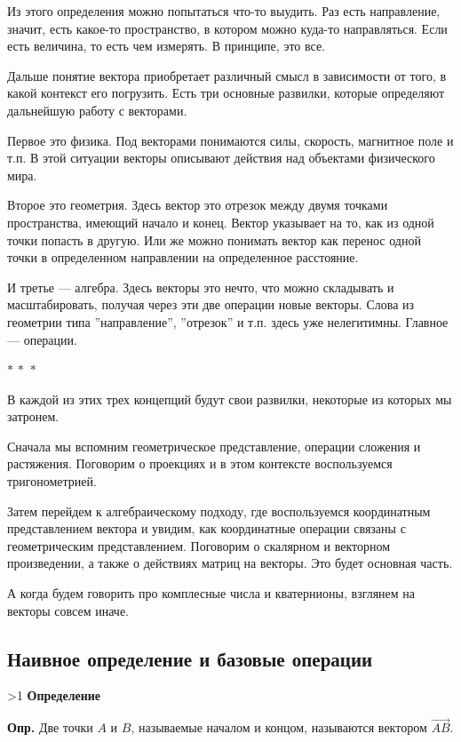 \documentclass[a4paper,12pt]{article}
\newcommand{\threestars}{\begin{center}$ {\ast}\,{\ast}\,{\ast} $\end{center}}
\newcounter{th-counter}
\newcounter{df-counter}
\newcounter{col-counter}
\newcommand{\df}{\par\noindent\textbf{Опр.} }
\newcounter{subpoint}[subsection]
\renewcommand{\thesubpoint}{\arabic{subpoint}}
\newcommand{\subpoint}[1]{%
  \refstepcounter{subpoint}%
  \ifnum\value{subpoint}>1
    \vspace{1em}%
  \fi
  \noindent\textbf{%
    \fcolorbox{black}{white}{\thesubpoint}\quad #1}%
  \par\vspace{0.2em}%
}
\begin{document}
Из этого определения можно попытаться что-то выудить. Раз есть направление, значит, есть какое-то пространство, в котором можно куда-то направляться. Если есть величина, то есть чем измерять. В принципе, это все.

Дальше понятие вектора приобретает различный смысл в зависимости от того, в какой контекст его погрузить. Есть три основные развилки, которые определяют дальнейшую работу с векторами.

Первое это физика. Под векторами понимаются силы, скорость, магнитное поле и т.п. В этой ситуации векторы описывают действия над объектами физического мира.

Второе это геометрия. Здесь вектор это отрезок между двумя точками пространства, имеющий начало и конец. Вектор указывает на то, как из одной точки попасть в другую. Или же можно понимать вектор как перенос одной точки в определенном направлении на определенное расстояние.

И третье --- алгебра. Здесь векторы это нечто, что можно складывать и масштабировать, получая через эти две операции новые векторы. Слова из геометрии типа ''направление'', ''отрезок'' и т.п. здесь уже нелегитимны. Главное --- операции.

\threestars

В каждой из этих трех концепций будут свои развилки, некоторые из которых мы затронем.

Сначала мы вспомним геометрическое представление, операции сложения и растяжения. Поговорим о проекциях и в этом контексте воспользуемся тригонометрией.

Затем перейдем к алгебраическому подходу, где воспользуемся координатным представлением вектора и увидим, как координатные операции связаны с геометрическим представлением. Поговорим о скалярном и векторном произведении, а также о действиях матриц на векторы. Это будет основная часть.

А когда будем говорить про комплесные числа и кватернионы, взглянем на векторы совсем иначе.

\subsection*{Наивное определение и базовые операции}

\subpoint{Определение}

\df Две точки $A$ и $B$, называемые началом и концом, называются вектором $\overrightarrow{AB}$.
\end{document}

